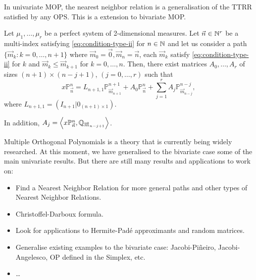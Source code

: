 \documentclass[portrait,final,a0paper,fontscale=0.38]{baposter}
\begin{document}
\begin{poster}
{%
}

{
  In univariate MOP, the nearest neighbor relation is a generalisation of the TTRR satisfied by any OPS. This is a extension to bivariate MOP.
\begin{theorem} 
  Let $\mu_1,\dots,\mu_r$ be a perfect system of 2-dimensional measures. Let $\vec n\in \mathbb{N}^r$ be a multi-index satisfying \eqref{eq:condition-type-ii} for $n\in\mathbb{N}$ and let us consider a path $\{\overrightarrow{m}_k:k=0,\dots,n+1\}$ where $\overrightarrow{m}_0=\vec 0, \overrightarrow{m}_n = \vec n$, each $\overrightarrow{m}_k$ satisfy \eqref{eq:condition-type-ii} for $k$ and $\overrightarrow{m}_k \leq \overrightarrow m_{k+1}$ for $k=0,\dots,n$. Then, there exist matrices $A_0,\dots,A_r$ of sizes $(n+1)\times(n-j+1)$,  $(j=0,\dots,r)$ such that
  \begin{equation}
      \label{eq:nearest-neighbor}
      \boxed{x\mathbb P_{\vec n}^n = L_{{n+1},1} \mathbb P_{\overrightarrow{m}_{n+1}}^{n+1} + A_0 \mathbb P_{\vec n}^n + \sum_{j=1}^r A_j \mathbb P_{\overrightarrow{m}_{n-j}}^{n-j},}
  \end{equation}
  where $L_{n+1,1}=(I_{n+1}|0_{(n+1)\times 1})$. 
  
  In addition, $A_j =\nolinebreak \prodesc{x\mathbb P_{\vec n}^n}{\mathbb Q_{\overrightarrow{m}_{n-j+1}}}$.
\end{theorem}


}

{
  Multiple Orthogonal Polynomials is a theory that is currently being widely researched. At this moment, we have generalised to the bivariate case some of the main univariate results. But there are still many results and applications to work on:
  \begin{itemize}
    \item Find a Nearest Neighbor Relation for more general paths and other types of Nearest Neighbor Relations.
    \item Christoffel-Darboux formula.
    \item Look for applications to Hermite-Padé approximants and random matrices.
    \item Generalise existing examples to the bivariate case: Jacobi-Piñeiro, Jacobi-Angelesco, OP defined in the Simplex, etc.
    \item \dots
  \end{itemize}


}
\end{poster}
\end{document}
